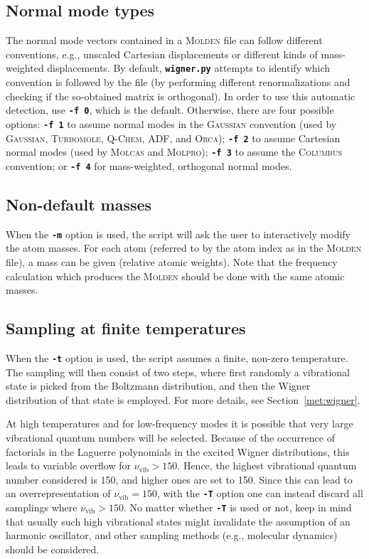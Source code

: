 \documentclass[a4paper,10pt,DIV=15,openany]{scrbook}
\newcommand{\ttt}[1]{\textbf{\texttt{#1}}}
\begin{document}
\subsection{Normal mode types}

The normal mode vectors contained in a \textsc{Molden} file can follow different conventions, e.g., unscaled Cartesian displacements or different kinds of mass-weighted displacements.
By default, \ttt{wigner.py} attempts to identify which convention is followed by the file (by performing different renormalizations and checking if the so-obtained matrix is orthogonal).
In order to use this automatic detection, use \ttt{-f 0}, which is the default.
Otherwise, there are four possible options: \ttt{-f 1} to assume normal modes in the \textsc{Gaussian} convention (used by \textsc{Gaussian}, \textsc{Turbomole}, \textsc{Q-Chem}, ADF, and \textsc{Orca}); \ttt{-f 2} to assume Cartesian normal modes (used by \textsc{Molcas} and \textsc{Molpro}); \ttt{-f 3} to assume the \textsc{Columbus} convention; or \ttt{-f 4} for mass-weighted, orthogonal normal modes.

\subsection{Non-default masses}

When the \ttt{-m} option is used, the script will ask the user to interactively modify the atom masses. For each atom (referred to by the atom index as in the \textsc{Molden} file), a mass can be given (relative atomic weights). Note that the frequency calculation which produces the \textsc{Molden} should be done with the same atomic masses.

\subsection{Sampling at finite temperatures}

When the \ttt{-t} option is used, the script assumes a finite, non-zero temperature.
The sampling will then consist of two steps, where first randomly a vibrational state is picked from the Boltzmann distribution, and then the Wigner distribution of that state is employed.
For more details, see Section~\ref{met:wigner}.

At high temperatures and for low-frequency modes it is possible that very large vibrational quantum numbers will be selected.
Because of the occurrence of factorials in the Laguerre polynomials in the excited Wigner distributions, this leads to variable overflow for $\nu_\text{vib}>150$. Hence, the highest vibrational quantum number considered is 150, and higher ones are set to 150.
Since this can lead to an overrepresentation of $\nu_\text{vib}=150$, with the \ttt{-T} option one can instead discard all samplings where $\nu_\text{vib}>150$.
No matter whether \ttt{-T} is used or not, keep in mind that usually such high vibrational states might invalidate the assumption of an harmonic oscillator, and other sampling methods (e.g., molecular dynamics) should be considered.
\end{document}
